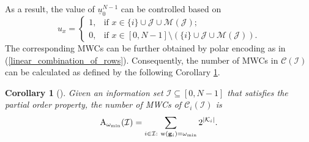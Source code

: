 \documentclass[12pt, draftclsnofoot, peerreview, onecolumn]{IEEEtran}
\makeatletter
\theoremstyle{noparent}
\newtheorem{corollary}[theorem]{\textbf{Corollary}}
\renewenvironment{proof}[1][\proofname]{\par
  \pushQED{\qed}
  \normalfont \topsep6\p@\@plus6\p@\relax
  \trivlist
  \item[\hskip\labelsep
        \itshape
    #1\@addpunct{:}]\ignorespaces
}{
  \popQED\endtrivlist\@endpefalse
}
\makeatother
\begin{document}
As a result, the value of $\underline{u}_0^{N-1}$ can be controlled based on 
\begin{equation}
    \label{polar_u_setting}
    u_{x}=
    \begin{cases}
    1, & \text {if } x\in \{i\}\cup\mathcal{J}\cup\mathcal{M}(\mathcal{J});\\
    0, & \text {if } x\in [0,N-1]\setminus(\{i\}\cup\mathcal{J}\cup\mathcal{M}(\mathcal{J})).
    \end{cases}
\end{equation}
The corresponding MWCs can be further obtained by polar encoding as in (\ref{linear_combination_of_rows}).
Consequently, the number of MWCs in  
$\mathcal{C}(\mathcal{I})$ can be calculated as defined by 
the following Corollary \ref{corollary_MWC_number_polar}.
\begin{corollary}[\cite{Rowshan2023FormationMinweight}]
    \label{corollary_MWC_number_polar}
    Given an information set $\mathcal{I} \subseteq [0,N-1]$ that satisfies the partial order property, 
    the number of MWCs of $\mathcal{C}_i(\mathcal{I})$ is 
    \begin{equation}
    \label{polar_MWC_number}
    {\rm A}_{\omega_{\min}}(\mathcal{I})=\sum_{i \in \mathcal{I}:\ {\rm w}({\bf g}_i)=\omega_{\min}} 2^{\left|\mathcal{K}_{i}\right|}. 
    \end{equation} 
\end{corollary}

\end{document}
